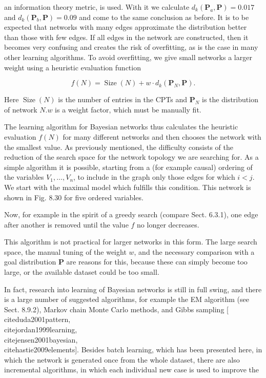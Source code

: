 \documentclass[10pt]{book}
\begin{document}
an information theory metric, is used. With it we calculate $d_{k}\left(\boldsymbol{P}_{a}, \boldsymbol{P}\right)=0.017$ and $d_{k}\left(\boldsymbol{P}_{b}, \boldsymbol{P}\right)=0.09$ and come to the same conclusion as before. It is to be expected that networks with many edges approximate the distribution better than those with few edges. If all edges in the network are constructed, then it becomes very confusing and creates the risk of overfitting, as is the case in many other learning algorithms. To avoid overfitting, we give small networks a larger weight using a heuristic evaluation function

$$
f(N)=\operatorname{Size}(N)+w \cdot d_{k}\left(\boldsymbol{P}_{N}, \boldsymbol{P}\right) .
$$

Here $\operatorname{Size}(N)$ is the number of entries in the CPTs and $\boldsymbol{P}_{N}$ is the distribution of network $N . w$ is a weight factor, which must be manually fit.

The learning algorithm for Bayesian networks thus calculates the heuristic evaluation $f(N)$ for many different networks and then chooses the network with the smallest value. As previously mentioned, the difficulty consists of the reduction of the search space for the network topology we are searching for. As a simple algorithm it is possible, starting from a (for example causal) ordering of the variables $V_{1}, \ldots, V_{n}$, to include in the graph only those edges for which $i<j$. We start with the maximal model which fulfills this condition. This network is shown in Fig. 8.30 for five ordered variables.

Now, for example in the spirit of a greedy search (compare Sect. 6.3.1), one edge after another is removed until the value $f$ no longer decreases.

This algorithm is not practical for larger networks in this form. The large search space, the manual tuning of the weight $w$, and the necessary comparison with a goal distribution $\boldsymbol{P}$ are reasons for this, because these can simply become too large, or the available dataset could be too small.

In fact, research into learning of Bayesian networks is still in full swing, and there is a large number of suggested algorithms, for example the EM algorithm (see Sect. 8.9.2), Markov chain Monte Carlo methods, and Gibbs sampling [\\cite{duda2001pattern}, \\cite{jordan1999learning}, \\cite{jensen2001bayesian}, \\cite{hastie2009elements}]. Besides batch learning, which has been presented here, in which the network is generated once from the whole dataset, there are also incremental algorithms, in which each individual new case is used to improve the
\end{document}

